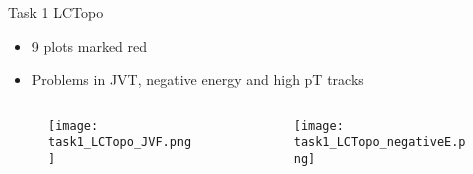 

\begin{frame}{Task 1 LCTopo}
\vspace{-0.3cm}
\begin{itemize}
\item 9 plots marked red
\item Problems in JVT, negative energy and high pT tracks
\end{itemize}
\begin{columns}
\begin{column}{0.5\textwidth}

\begin{figure}
\centering
\texttt{[image: task1\_LCTopo\_JVF.png]}
\end{figure}

\end{column}
\begin{column}{0.5\textwidth}

\begin{figure}
\centering
\texttt{[image: task1\_LCTopo\_negativeE.png]}
\end{figure}

\end{column}
\end{columns}
\end{frame}